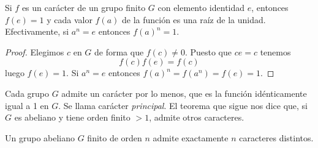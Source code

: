 \documentclass[12pt,a4paper]{book}
\begin{document}
    \begin{teorema}
        Si $f$ es un carácter de un grupo finito $G$ con elemento identidad $e$, entonces
        $f(e)=1$ y cada valor $f(a)$ de la función es una raíz de la unidad. Efectivamente,
        si $a^{n}=e$ entonces $f(a)^{n}=1$.
    \end{teorema}

    \begin{proof}
        Elegimos $c$ en $G$ de forma que $f(c)\neq0$. Puesto que $ce=c$ tenemos
        \begin{equation*}
            f(c)f(e)=f(c)
        \end{equation*}
        luego $f(e)=1$. Si $a^{n}=e$ entonces $f(a)^{n}=f(a^{n})=f(e)=1$.
    \end{proof}

    \begin{ejemplo}
        Cada grupo $G$ admite un carácter por lo menos, que es la función idénticamente
        igual a 1 en $G$. Se llama carácter \textit{principal}. El teorema que sigue nos
        dice que, si $G$ es abeliano y tiene orden finito $>1$, admite otros caracteres.
    \end{ejemplo}

    \begin{teorema}
        Un grupo abeliano $G$ finito de orden $n$ admite exactamente $n$ caracteres
        distintos.
    \end{teorema}
\end{document}
